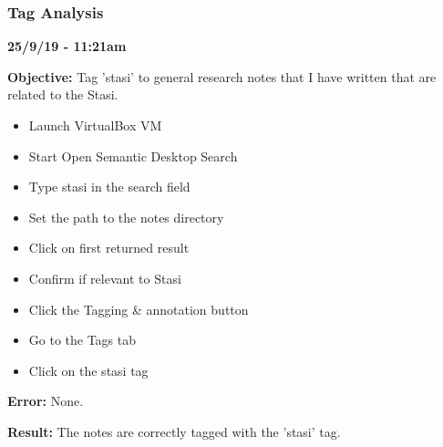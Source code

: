 \documentclass{article}
\begin{document}
\subsubsection{Tag Analysis}

\textbf{25/9/19 - 11:21am}

\textbf{Objective:} Tag 'stasi' to general research notes that I have written that are related to the Stasi.

\begin{itemize}
    \item Launch VirtualBox VM
    \item Start Open Semantic Desktop Search
    \item Type stasi in the search field
    \item Set the path to the notes directory
    \item Click on first returned result
    \item Confirm if relevant to Stasi
    \item Click the Tagging \& annotation button
    \item Go to the Tags tab
    \item Click on the stasi tag
\end{itemize}

\textbf{Error:} None.

\textbf{Result:} The notes are correctly tagged with the 'stasi' tag.
\end{document}
